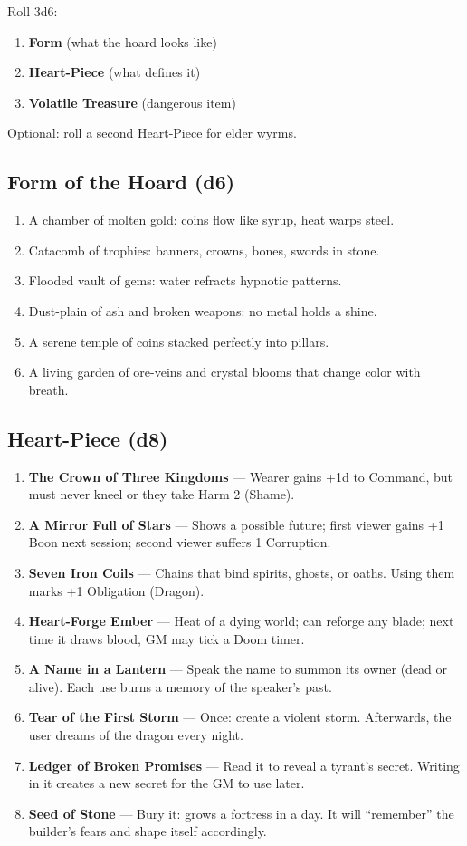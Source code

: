 \documentclass[11pt,letterpaper]{article}
\begin{document}
Roll 3d6:
\begin{enumerate}[leftmargin=*]
\item \textbf{Form} (what the hoard looks like)
\item \textbf{Heart-Piece} (what defines it)
\item \textbf{Volatile Treasure} (dangerous item)
\end{enumerate}

Optional: roll a second Heart-Piece for elder wyrms.

\subsection{Form of the Hoard (d6)}

\begin{enumerate}[leftmargin=*]
\item A chamber of molten gold: coins flow like syrup, heat warps steel.
\item Catacomb of trophies: banners, crowns, bones, swords in stone.
\item Flooded vault of gems: water refracts hypnotic patterns.
\item Dust-plain of ash and broken weapons: no metal holds a shine.
\item A serene temple of coins stacked perfectly into pillars.
\item A living garden of ore-veins and crystal blooms that change color with breath.
\end{enumerate}

\subsection{Heart-Piece (d8)}

\begin{enumerate}[leftmargin=*]
\item \textbf{The Crown of Three Kingdoms} --- Wearer gains +1d to Command, but must never kneel or they take Harm 2 (Shame).
\item \textbf{A Mirror Full of Stars} --- Shows a possible future; first viewer gains +1 Boon next session; second viewer suffers 1 Corruption.
\item \textbf{Seven Iron Coils} --- Chains that bind spirits, ghosts, or oaths. Using them marks +1 Obligation (Dragon).
\item \textbf{Heart-Forge Ember} --- Heat of a dying world; can reforge any blade; next time it draws blood, GM may tick a Doom timer.
\item \textbf{A Name in a Lantern} --- Speak the name to summon its owner (dead or alive). Each use burns a memory of the speaker's past.
\item \textbf{Tear of the First Storm} --- Once: create a violent storm. Afterwards, the user dreams of the dragon every night.
\item \textbf{Ledger of Broken Promises} --- Read it to reveal a tyrant's secret. Writing in it creates a new secret for the GM to use later.
\item \textbf{Seed of Stone} --- Bury it: grows a fortress in a day. It will ``remember'' the builder's fears and shape itself accordingly.
\end{enumerate}
\end{document}
